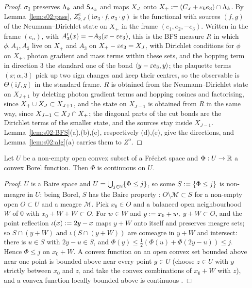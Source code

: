 \begin{proof}
$\sigma_3$ preserves $\Lambda_k$ and $\mathsf S_{\Lambda_k}$ and maps $X_J$ onto $X_+:=(C_J+\varepsilon_ke_3)\cap\Lambda_k$. By Lemma~\ref{lem:s02:pass}, $Z^a_{k,J}(\mathrm i\sigma_3\cdot f,\sigma_3\cdot g)$ is the functional with sources $(f,g)$ of the Neumann--Dirichlet state on $X_+$ in the frame $(e_1,e_2,-e_3)$. Written in the frame $(e_\alpha)$, with $A'_3(x)=-A_3(x-\varepsilon e_3)$, this is the BFS measure $R$ in which $\phi,A_1,A_2$ live on $X_+$ and $A_3$ on $X_+-\varepsilon e_3=X_J$, with Dirichlet conditions for $\phi$ on $X_+$, photon gradient and mass terms within these sets, and the hopping term in direction $3$ the standard one of the bond $\langle y-\varepsilon e_3,y\rangle$; the plaquette terms $(x;\alpha,3)$ pick up two sign changes and keep their centres, so the observable is $\Theta(\mathrm if,g)$ in the standard frame. $R$ is obtained from the Neumann--Dirichlet state on $X_{J+1}$ by deleting photon gradient terms and hopping cosines and factorising, since $X_+\cup X_J\subset X_{J+1}$, and the state on $X_{J-1}$ is obtained from $R$ in the same way, since $X_{J-1}\subset X_J\cap X_+$; the diagonal parts of the cut bonds are the Dirichlet terms of the smaller state, and the sources stay inside $X_{J-1}$. Lemma~\ref{lem:s02:BFS}(a),(b),(e), respectively (d),(e), give the directions, and Lemma~\ref{lem:s02:alg}(a) carries them to $Z^a$.
\end{proof}

\begin{lemma}\label{lem:s02:baire}
Let $U$ be a non-empty open convex subset of a Fr\'echet space and $\Phi:U\to\mathbb R$ a convex Borel function. Then $\Phi$ is continuous on $U$.
\end{lemma}

\begin{proof}
$U$ is a Baire space and $U=\bigcup_{j\in\mathbb N}\{\Phi\le j\}$, so some $S:=\{\Phi\le j\}$ is non-meagre in $U$; being Borel, $S$ has the Baire property \cite{Kec95}: $O\setminus\mathcal M\subset S$ for a non-empty open $O\subset U$ and a meagre $\mathcal M$. Pick $x_0\in O$ and a balanced open neighbourhood $W$ of $0$ with $x_0+W+W\subset O$. For $w\in W$ and $y:= x_0+w$, $y+W\subset O$, and the point reflection $\iota(x):=2y-x$ maps $y+W$ onto itself and preserves meagre sets; so $S\cap(y+W)$ and $\iota(S\cap(y+W))$ are comeagre in $y+W$ and intersect: there is $u\in S$ with $2y-u\in S$, and $\Phi(y)\le\frac12(\Phi(u)+\Phi(2y-u))\le j$. Hence $\Phi\le j$ on $x_0+W$. A convex function on an open convex set bounded above near one point is bounded above near every point $y\in U$ (choose $z\in U$ with $y$ strictly between $x_0$ and $z$, and take the convex combinations of $x_0+W$ with $z$), and a convex function locally bounded above is continuous \cite{RS1}.
\end{proof}
